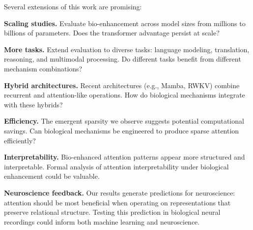 Several extensions of this work are promising:

\textbf{Scaling studies.} Evaluate bio-enhancement across model sizes from millions to billions of parameters. Does the transformer advantage persist at scale?

\textbf{More tasks.} Extend evaluation to diverse tasks: language modeling, translation, reasoning, and multimodal processing. Do different tasks benefit from different mechanism combinations?

\textbf{Hybrid architectures.} Recent architectures (e.g., Mamba, RWKV) combine recurrent and attention-like operations. How do biological mechanisms integrate with these hybrids?

\textbf{Efficiency.} The emergent sparsity we observe suggests potential computational savings. Can biological mechanisms be engineered to produce sparse attention efficiently?

\textbf{Interpretability.} Bio-enhanced attention patterns appear more structured and interpretable. Formal analysis of attention interpretability under biological enhancement could be valuable.

\textbf{Neuroscience feedback.} Our results generate predictions for neuroscience: attention should be most beneficial when operating on representations that preserve relational structure. Testing this prediction in biological neural recordings could inform both machine learning and neuroscience.
